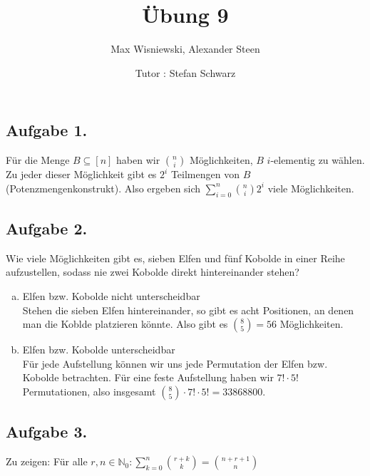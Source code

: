 \documentclass[11pt,a4paper,ngerman]{article}
\date{Tutor : Stefan Schwarz}
\title{Übung 9}
\author{Max Wisniewski, Alexander Steen}
\begin{document}

\renewcommand{\figurename}{Figure}

\maketitle
\thispagestyle{fancy}

\subsection*{Aufgabe 1.}
Für die Menge $B \subseteq [n]$ haben wir $\binom{n}{i}$ Möglichkeiten, $B$ $i$-elementig zu wählen.
Zu jeder dieser Möglichkeit gibt es $2^i$ Teilmengen von $B$ (Potenzmengenkonstrukt). Also ergeben
sich $\sum_{i=0}^n \binom{n}{i} 2^i$ viele Möglichkeiten.

\subsection*{Aufgabe 2.}
Wie viele Möglichkeiten gibt es, sieben Elfen und fünf Kobolde in einer Reihe aufzustellen,
sodass nie zwei Kobolde direkt hintereinander stehen?
\begin{enumerate}[a)]
\item Elfen bzw. Kobolde nicht unterscheidbar \\
    Stehen die sieben Elfen hintereinander, so gibt es acht Positionen, an denen man die Koblde
    platzieren könnte. Also gibt es $\binom{8}{5} = 56$ Möglichkeiten.
\item Elfen bzw. Kobolde unterscheidbar \\
    Für jede Aufstellung können wir uns jede Permutation der Elfen bzw. Kobolde betrachten. Für eine
    feste Aufstellung haben wir $7! \cdot 5!$ Permutationen, also insgesamt
    $\binom{8}{5} \cdot 7! \cdot 5! = 33 868 800$.
\end{enumerate}

\subsection*{Aufgabe 3.}
Zu zeigen: Für alle $r,n \in \mathbb{N}_0: \sum_{k=0}^n \binom{r+k}{k} = \binom{n+r+1}{n}$
\end{document}
